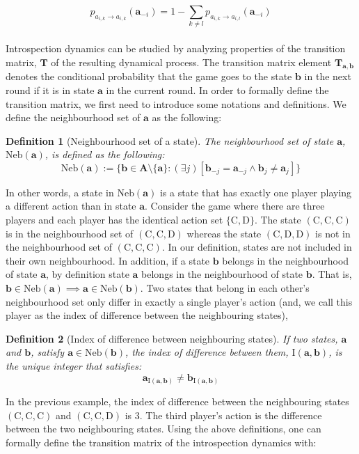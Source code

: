 \documentclass[11pt]{article}
\theoremstyle{plainCl1}
\newtheorem{definition}{Definition}
\theoremstyle{plainCl2}
\newcommand{\A}{\mathbf{A}}
\newcommand{\abf}{\mathbf{a}}
\newcommand{\bbf}{\mathbf{b}}
\newcommand{\T}{\mathbf{T}}
\newcommand{\C}{\mathrm{C}}
\newcommand{\D}{\mathrm{D}}
\begin{document}
\begin{equation}
 p_{a_{i,k} \to a_{i,k}} (\abf_{-i}) = 1 - \sum_{k \neq l} p_{a_{i,k} \to a_{i,l}} (\abf_{-i})
 \label{Eq:introspection-normalization}
\end{equation}
\\ 
Introspection dynamics can be studied by analyzing properties of the transition matrix, $\T$ of the resulting dynamical process. The transition matrix element $\T_{\abf,\bbf}$ denotes the conditional probability that the game goes to the state $\bbf$ in the next round if it is in state $\abf$ in the current round. In order to formally define the transition matrix, we first need to introduce some notations and definitions. We define the neighbourhood set of $\abf$ as the following:

\begin{definition}[Neighbourhood set of a state] The neighbourhood set of state $\abf$, $\mathrm{Neb}(\abf)$, is defined as the following:
\begin{equation}
\mathrm{Neb}(\abf) := \{\bbf \in \A \setminus \{ \abf \}  : (\exists j) [ \bbf_{-j} = \abf_{-j} \land  \bbf_{j} \neq \abf_{j}] \}
\label{Eq:neighbourhood-states}
\end{equation} 
\label{Def:neighbourhood-states}
\end{definition} 
\noindent In other words, a state in $\mathrm{Neb}(\abf)$ is a state that has exactly one player playing a different action than in state $\abf$. Consider the game where there are  three players and each player has the identical action set $\{\C, \D \}$.  The state $(\C,\C,\C)$ is in the neighbourhood set of $(\C,\C,\D)$ whereas the state $(\C,\D,\D)$ is not in the neighbourhood set of $(\C,\C, \C)$. In our definition, states are not included in their own neighbourhood. In addition, if a state $\bbf$ belongs in the neighbourhood of state $\abf$, by definition state $\abf$ belongs in the neighbourhood of state $\bbf$. That is, $\bbf \in \mathrm{Neb}(\abf) \implies \abf \in \mathrm{Neb}(\bbf)$. Two states that belong in each other's neighbourhood set only differ in exactly a single player's action (and, we call this player as the index of difference between the neighbouring states),

\begin{definition} [Index of difference between neighbouring states] If two states, $\abf$ and $\bbf$, satisfy $\abf \in \mathrm{Neb}(\bbf)$, the index of difference between them, $\mathrm{I}(\abf, \bbf)$, is the unique integer that satisfies:
\begin{equation}
\abf_{\mathrm{I}(\abf, \bbf)} \neq \bbf_{\mathrm{I}(\abf, \bbf)}
\end{equation} 
\label{Def:index-of-difference}
\end{definition} 
\noindent In the previous example, the index of difference between the neighbouring states $(\C,\C,\C)$ and $(\C,\C,\D)$ is $3$. The third player's action is the difference between the two neighbouring states. Using the above definitions, one can formally define the transition matrix of the introspection dynamics with:
\end{document}
